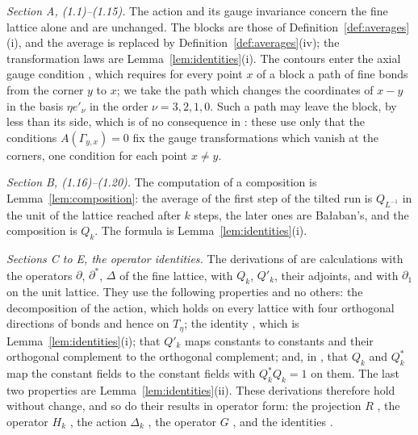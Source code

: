 \documentclass[11pt]{preprint}
\numberwithin{equation}{section}
\theoremstyle{definition}
\theoremstyle{remark}
\theoremstyle{plain}
\begin{document}
\emph{Section A, (1.1)--(1.15).} The action \cite[(1.3), (1.5)]{BalabanPRT1} and its gauge invariance \cite[(1.4)]{BalabanPRT1} concern the fine lattice alone and are unchanged. The blocks \cite[(1.6)]{BalabanPRT1} are those of Definition~\ref{def:averages}(i), and the average \cite[(1.8), (1.11)]{BalabanPRT1} is replaced by Definition~\ref{def:averages}(iv); the transformation laws \cite[(1.9), (1.13)]{BalabanPRT1} are Lemma~\ref{lem:identities}(i). The contours \cite[(1.7)]{BalabanPRT1} enter the axial gauge condition \cite[(1.10)]{BalabanPRT1}, which requires for every point $x$ of a block a path of fine bonds from the corner $y$ to $x$; we take the path which changes the coordinates of $x - y$ in the basis $\eta e'_\nu$ in the order $\nu = 3, 2, 1, 0$. Such a path may leave the block, by less than its side, which is of no consequence in \cite[(1.10)--(1.15)]{BalabanPRT1}: these use only that the conditions $A(\Gamma_{y,x}) = 0$ fix the gauge transformations which vanish at the corners, one condition for each point $x \neq y$.

\emph{Section B, (1.16)--(1.20).} The computation \cite[(1.16)]{BalabanPRT1} of a composition is Lemma~\ref{lem:composition}: the average of the first step of the tilted run is $Q_{L^{-1}}$ in the unit of the lattice reached after $k$ steps, the later ones are Ba{\l}aban's, and the composition is $Q_k$. The formula \cite[(1.20)]{BalabanPRT1} is Lemma~\ref{lem:identities}(i).

\emph{Sections C to E, the operator identities.} The derivations of \cite[(1.21)--(1.28), (1.38)--(1.44), (1.46)--(1.60), (1.64), (1.65), (1.68)--(1.82), (1.91)--(1.107)]{BalabanPRT1} are calculations with the operators $\partial$, $\partial^*$, $\Delta$ of the fine lattice, with $Q_k$, $Q'_k$, their adjoints, and with $\partial_1$ on the unit lattice. They use the following properties and no others: the decomposition \cite[(1.21)]{BalabanPRT1} of the action, which holds on every lattice with four orthogonal directions of bonds and hence on $T_\eta$; the identity \cite[(1.55)]{BalabanPRT1}, which is Lemma~\ref{lem:identities}(i); that $Q'_k$ maps constants to constants and their orthogonal complement to the orthogonal complement; and, in \cite[(1.57)--(1.59), (1.74), (1.82)]{BalabanPRT1}, that $Q_k$ and $Q_k^*$ map the constant fields to the constant fields with $Q_k^*Q_k = 1$ on them. The last two properties are Lemma~\ref{lem:identities}(ii). These derivations therefore hold without change, and so do their results in operator form: the projection $R$ \cite[(1.38), (1.44)]{BalabanPRT1}, the operator $H_k$ \cite[(1.60), (1.103)]{BalabanPRT1}, the action $\Delta_k$ \cite[(1.65)]{BalabanPRT1}, the operator $G$ \cite[(1.81), (1.82)]{BalabanPRT1}, and the identities \cite[(1.95), (1.97), (1.99), (1.107)]{BalabanPRT1}.
\end{document}
